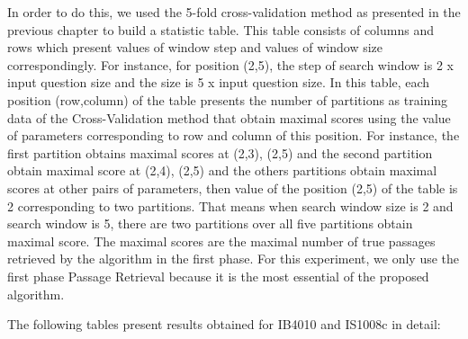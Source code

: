 In order to do this, we used the 5-fold cross-validation method as presented in the previous chapter to build a statistic table. This table consists of columns and rows which present values of window step and values of window size correspondingly. For instance, for position (2,5), the step of search window is 2 x input question size and the size is 5 x input question size. In this table, each position (row,column) of the table presents the number of partitions as training data of the Cross-Validation method that obtain maximal scores using the value of parameters corresponding to row and column of this position. For instance, the first partition obtains maximal scores at (2,3), (2,5) and the second partition obtain maximal score at (2,4), (2,5) and the others partitions obtain maximal scores at other pairs of parameters, then value of the position (2,5) of the table is 2 corresponding to two partitions. That means when search window size is 2 and search window is 5, there are two partitions over all five partitions obtain maximal score. The maximal scores are the maximal number of true passages retrieved by the algorithm in the first phase. For this experiment, we only use the first phase Passage Retrieval because it is the most essential of the proposed algorithm.

The following tables present results obtained for IB4010 and IS1008c in detail:


